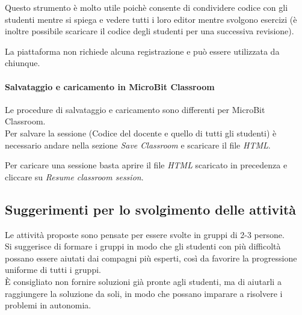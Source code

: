 \documentclass[../../docenti.tex]{subfiles}
\begin{document}
Questo strumento è molto utile poichè consente di condividere codice con gli studenti mentre si spiega e vedere tutti i loro editor mentre svolgono esercizi (è inoltre possibile scaricare il codice degli studenti per una successiva revisione).

La piattaforma non richiede alcuna registrazione e può essere utilizzata da chiunque.

\paragraph{Salvataggio e caricamento in MicroBit Classroom}
Le procedure di salvataggio e caricamento sono differenti per MicroBit Classroom.\\
Per salvare la sessione (Codice del docente e quello di tutti gli studenti) è necessario andare nella sezione \textit{Save Classroom} e scaricare il file \textit{HTML}.

Per caricare una sessione basta aprire il file \textit{HTML} scaricato in precedenza e cliccare su \textit{Resume classroom session}.

\subsection{Suggerimenti per lo svolgimento delle attività}
Le attività proposte sono pensate per essere svolte in gruppi di 2-3 persone.\\
Si suggerisce di formare i gruppi in modo che gli studenti con più difficoltà possano essere aiutati dai compagni più esperti, così da favorire la progressione uniforme di tutti i gruppi.\\
È consigliato non fornire soluzioni già pronte agli studenti, ma di aiutarli a raggiungere la soluzione da soli, in modo che possano imparare a risolvere i problemi in autonomia.
\end{document}
